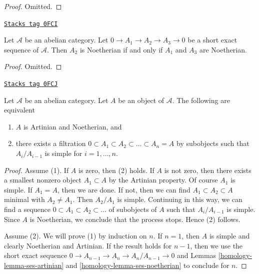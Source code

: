 \begin{proof}
Omitted.
\end{proof}

\begin{lemma}
\label{homology-lemma-ses-noetherian}
\href{https://stacks.math.columbia.edu/tag/0FCI}{\texttt{Stacks tag 0FCI}}

Let $\mathcal{A}$ be an abelian category. Let $0 \to A_1 \to A_2 \to A_3 \to 0$
be a short exact sequence of $\mathcal{A}$. Then $A_2$ is Noetherian
if and only if $A_1$ and $A_3$ are Noetherian.
\end{lemma}

\begin{proof}
Omitted.
\end{proof}

\begin{lemma}
\label{homology-lemma-finite-length}
\href{https://stacks.math.columbia.edu/tag/0FCJ}{\texttt{Stacks tag 0FCJ}}

Let $\mathcal{A}$ be an abelian category. Let $A$ be an object
of $\mathcal{A}$. The following are equivalent
\begin{enumerate}
\item $A$ is Artinian and Noetherian, and
\item there exists a filtration
$0 \subset A_1 \subset A_2 \subset \ldots \subset A_n = A$
by subobjects such that $A_i/A_{i - 1}$ is simple for $i = 1, \ldots, n$.
\end{enumerate}
\end{lemma}

\begin{proof}

Assume (1). If $A$ is zero, then (2) holds. If $A$ is not zero, then
there exists a smallest nonzero object $A_1 \subset A$ by the Artinian
property. Of course $A_1$ is simple. If $A_1 = A$, then we are done.
If not, then we can find $A_1 \subset A_2 \subset A$ minimal
with $A_2 \not = A_1$. Then $A_2/A_1$ is simple. Continuing in this way, we
can find a sequence $0 \subset A_1 \subset A_2 \subset \ldots $
of subobjects of $A$ such that $A_i/A_{i - 1}$ is simple. Since $A$
is Noetherian, we conclude that the process stops. Hence (2) follows.

\medskip\noindent
Assume (2). We will prove (1) by induction on $n$. If $n = 1$, then
$A$ is simple and clearly Noetherian and Artinian. If the result holds
for $n - 1$, then we use the short exact sequence
$0 \to A_{n - 1} \to A_n \to A_n/A_{n - 1} \to 0$
and Lemmas \ref{homology-lemma-ses-artinian} and \ref{homology-lemma-ses-noetherian}
to conclude for $n$.
\end{proof}

